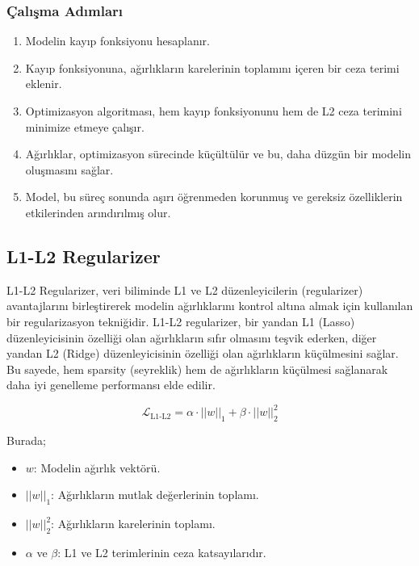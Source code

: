 \subsubsection{Çalışma Adımları}

\begin{enumerate}
    \item Modelin kayıp fonksiyonu hesaplanır.
    \item Kayıp fonksiyonuna, ağırlıkların karelerinin toplamını içeren bir ceza terimi eklenir.
    \item Optimizasyon algoritması, hem kayıp fonksiyonunu hem de L2 ceza terimini minimize etmeye çalışır.
    \item Ağırlıklar, optimizasyon sürecinde küçültülür ve bu, daha düzgün bir modelin oluşmasını sağlar.
    \item Model, bu süreç sonunda aşırı öğrenmeden korunmuş ve gereksiz özelliklerin etkilerinden arındırılmış olur.
\end{enumerate}

\newpage

\subsection{L1-L2 Regularizer}

L1-L2 Regularizer, veri biliminde L1 ve L2 düzenleyicilerin (regularizer) avantajlarını birleştirerek modelin ağırlıklarını kontrol altına almak için kullanılan bir regularizasyon tekniğidir. L1-L2 regularizer, bir yandan L1 (Lasso) düzenleyicisinin özelliği olan ağırlıkların sıfır olmasını teşvik ederken, diğer yandan L2 (Ridge) düzenleyicisinin özelliği olan ağırlıkların küçülmesini sağlar. Bu sayede, hem sparsity (seyreklik) hem de ağırlıkların küçülmesi sağlanarak daha iyi genelleme performansı elde edilir.

\[ \mathcal{L}_{\text{L1-L2}} = \alpha \cdot ||w||_1 + \beta \cdot ||w||_2^2 \]

Burada;

\begin{itemize}
    \item $w$: Modelin ağırlık vektörü.
    \item $||w||_1$: Ağırlıkların mutlak değerlerinin toplamı.
    \item $||w||_2^2$: Ağırlıkların karelerinin toplamı.
    \item $\alpha$ ve $\beta$: L1 ve L2 terimlerinin ceza katsayılarıdır.
\end{itemize}

